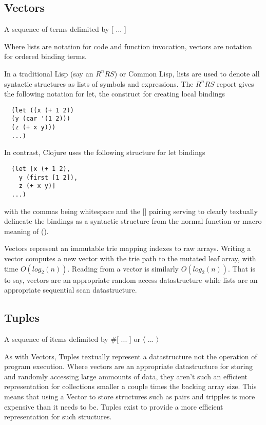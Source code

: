 \documentclass{report}
\begin{document}
\subsection{Vectors}

A sequence of terms delimited by [ ... ]

Where lists are notation for code and function invocation, vectors are
notation for ordered binding terms.

In a traditional Lisp (say an $R^nRS$) or Common Lisp, lists are used to
denote all syntactic structures as lists of symbols and expressions. The
$R^nRS$ report gives the following notation for let, the construct for
creating local bindings

\begin{lstlisting}
  (let ((x (+ 1 2))
  (y (car '(1 2)))
  (z (+ x y)))
  ...)
\end{lstlisting}

In contrast, Clojure uses the following structure for let bindings

\begin{lstlisting}
  (let [x (+ 1 2),
    y (first [1 2]),
    z (+ x y)]
  ...)
\end{lstlisting}

with the commas being whitespace and the [] pairing serving to clearly
textually delineate the bindings as a syntactic structure from the normal
function or macro meaning of ().

Vectors represent an immutable trie mapping indexes to raw arrays. Writing a
vector computes a new vector with the trie path to the mutated leaf array,
with time $O(log_2(n))$. Reading from a vector is similarly
$O(log_2(n))$. That is to say, vectors are an appropriate random access
datastructure while lists are an appropriate sequential scan datastructure.

\subsection{Tuples}

A sequence of items delimited by \#[ ... ] or 〈 ... 〉

As with Vectors, Tuples textually represent a datastructure not the operation
of program execution. Where vectors are an appropriate datastructure for
storing and randomly accessing large ammounts of data, they aren't such an
efficient representation for collections smaller a couple times the backing
array size. This means that using a Vector to store structures such as pairs
and tripples is more expensive than it needs to be. Tuples exist to provide a
more efficient representation for such structures.
\end{document}
